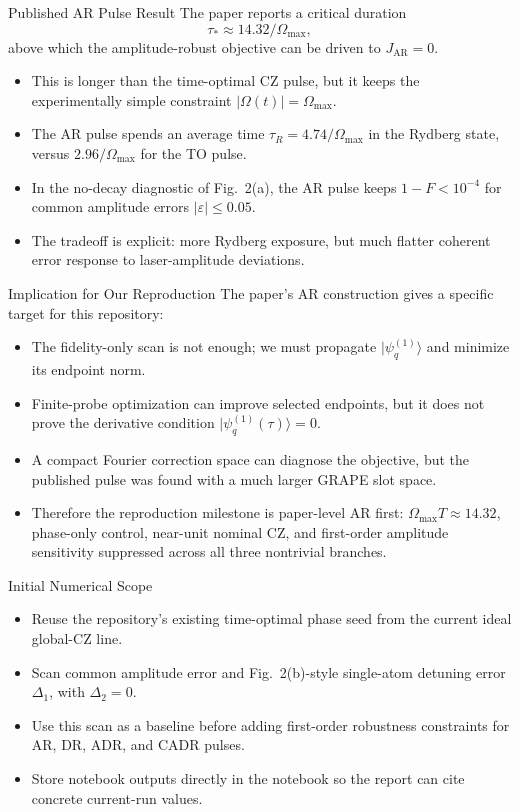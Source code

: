 \documentclass[aspectratio=169]{beamer}
\begin{document}
\begin{frame}{Published AR Pulse Result}
  The paper reports a critical duration
  \[
    \tau_* \approx 14.32/\Omega_{\max},
  \]
  above which the amplitude-robust objective can be driven to \(J_{\mathrm{AR}}=0\).
  \begin{itemize}
    \item This is longer than the time-optimal CZ pulse, but it keeps the experimentally simple constraint \(|\Omega(t)|=\Omega_{\max}\).
    \item The AR pulse spends an average time
      \(\tau_R=4.74/\Omega_{\max}\) in the Rydberg state, versus
      \(2.96/\Omega_{\max}\) for the TO pulse.
    \item In the no-decay diagnostic of Fig.~2(a), the AR pulse keeps
      \(1-F<10^{-4}\) for common amplitude errors \(|\varepsilon|\leq0.05\).
    \item The tradeoff is explicit: more Rydberg exposure, but much flatter coherent error response to laser-amplitude deviations.
  \end{itemize}
\end{frame}

\begin{frame}{Implication for Our Reproduction}
  The paper's AR construction gives a specific target for this repository:
  \begin{itemize}
    \item The fidelity-only scan is not enough; we must propagate
      \(|\psi_q^{(1)}\rangle\) and minimize its endpoint norm.
    \item Finite-probe optimization can improve selected endpoints, but it does not prove the derivative condition
      \(|\psi_q^{(1)}(\tau)\rangle=0\).
    \item A compact Fourier correction space can diagnose the objective, but the published pulse was found with a much larger GRAPE slot space.
    \item Therefore the reproduction milestone is paper-level AR first:
      \(\Omega_{\max}T\approx14.32\), phase-only control, near-unit nominal CZ, and first-order amplitude sensitivity suppressed across all three nontrivial branches.
  \end{itemize}
\end{frame}

\begin{frame}{Initial Numerical Scope}
  \begin{itemize}
    \item Reuse the repository's existing time-optimal phase seed from the current ideal global-CZ line.
    \item Scan common amplitude error and Fig.~2(b)-style single-atom detuning error \(\Delta_1\), with \(\Delta_2=0\).
    \item Use this scan as a baseline before adding first-order robustness constraints for AR, DR, ADR, and CADR pulses.
    \item Store notebook outputs directly in the notebook so the report can cite concrete current-run values.
  \end{itemize}
\end{frame}
\end{document}
